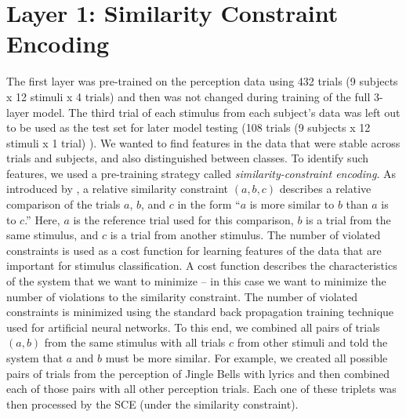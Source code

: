 \section{Layer 1: Similarity Constraint Encoding}
The first layer was pre-trained on the perception data using 432 trials (9 subjects x 12 stimuli x 4 trials) and then was not changed during training of the full 3-layer model. 
The third trial of each stimulus from each subject's data was left out to be used as the test set for later model testing (108 trials (9 subjects x 12 stimuli x 1 trial) ).
We wanted to find features in the data that were stable across trials and subjects, and also distinguished between classes. 
To identify such features, we used a pre-training strategy called \emph{similarity-constraint encoding}.
As introduced by \cite{schultz_learning_2004}, a relative similarity constraint $(a,b,c)$ describes a relative comparison of the trials $a$, $b$, and $c$ in the form ``$a$ is more similar to $b$ than $a$ is to $c$.''
Here, $a$ is the reference trial used for this comparison, $b$ is a trial from the same stimulus, and $c$ is a trial from another stimulus.
The number of violated constraints is used as a cost function for learning features of the data that are important for stimulus classification. 
A cost function describes the characteristics of the system that we want to minimize -- in this case we want to minimize the number of violations to the similarity constraint.
The number of violated constraints is minimized using the standard back propagation training technique used for artificial neural networks.
To this end, we combined all pairs of trials $(a,b)$ from the same stimulus with all trials $c$ from other stimuli and told the system that $a$ and $b$ must be more similar.
For example, we created all possible pairs of trials from the perception of Jingle Bells with lyrics and then combined each of those pairs with all other perception trials.
Each one of these triplets was then processed by the \ac{SCE} (under the similarity constraint).
